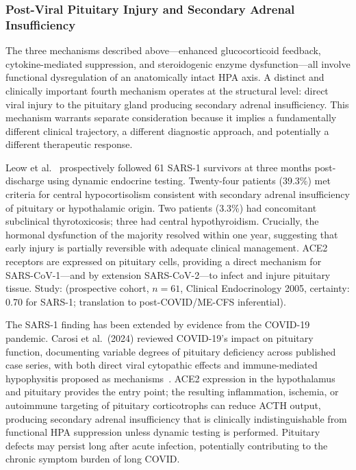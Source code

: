 \subsubsection{Post-Viral Pituitary Injury and Secondary Adrenal Insufficiency}
\label{sec:postviral-pituitary}

The three mechanisms described above---enhanced glucocorticoid feedback, cytokine-mediated suppression, and steroidogenic enzyme dysfunction---all involve functional dysregulation of an anatomically intact HPA axis. A distinct and clinically important fourth mechanism operates at the structural level: direct viral injury to the pituitary gland producing secondary adrenal insufficiency. This mechanism warrants separate consideration because it implies a fundamentally different clinical trajectory, a different diagnostic approach, and potentially a different therapeutic response.

\begin{achievement}
\label{ach:sars-pituitary}
Leow et al.~\cite{Leow2005sars} prospectively followed 61 SARS-1 survivors at three months post-discharge using dynamic endocrine testing. Twenty-four patients (39.3\%) met criteria for central hypocortisolism consistent with secondary adrenal insufficiency of pituitary or hypothalamic origin. Two patients (3.3\%) had concomitant subclinical thyrotoxicosis; three had central hypothyroidism. Crucially, the hormonal dysfunction of the majority resolved within one year, suggesting that early injury is partially reversible with adequate clinical management. ACE2 receptors are expressed on pituitary cells, providing a direct mechanism for SARS-CoV-1---and by extension SARS-CoV-2---to infect and injure pituitary tissue.
Study: (prospective cohort, $n=61$, Clinical Endocrinology 2005, certainty: 0.70 for SARS-1; translation to post-COVID/ME-CFS inferential).
\end{achievement}

The SARS-1 finding has been extended by evidence from the COVID-19 pandemic. Carosi et al.\ (2024) reviewed COVID-19's impact on pituitary function, documenting variable degrees of pituitary deficiency across published case series, with both direct viral cytopathic effects and immune-mediated hypophysitis proposed as mechanisms~\cite{Carosi2024hypopituitarism}. ACE2 expression in the hypothalamus and pituitary provides the entry point; the resulting inflammation, ischemia, or autoimmune targeting of pituitary corticotrophs can reduce ACTH output, producing secondary adrenal insufficiency that is clinically indistinguishable from functional HPA suppression unless dynamic testing is performed. Pituitary defects may persist long after acute infection, potentially contributing to the chronic symptom burden of long COVID.

